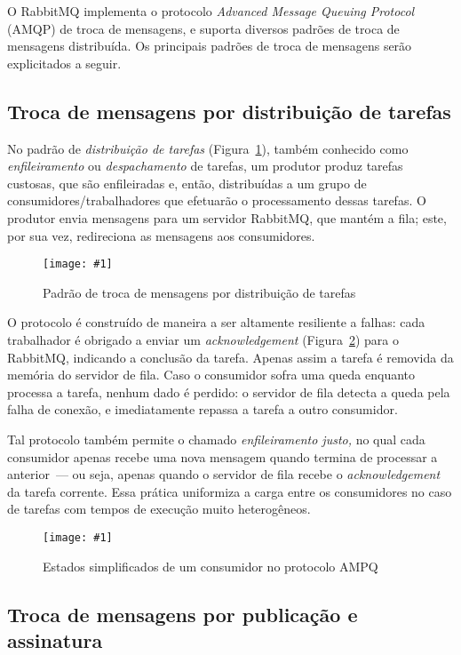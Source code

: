 \documentclass[ruledheader, 12pt]{abnt}
\newcommand{\figcustom}[4]{\par
	\begin{figure}[#3]
		\centering
		\texttt{[image: \#1]}
		\caption{\label{fig:#1}#2}
	\end{figure}
\par}
\newcommand{\fig}[2]{\figcustom{#1}{#2}{bp}{1}}
\newcommand{\figsmall}[2]{\figcustom{#1}{#2}{bp}{.6}}
\newcommand{\figref}[1]{(Figura~\ref{fig:#1})}
\begin{document}

O RabbitMQ implementa o protocolo \emph{Advanced Message Queuing Protocol} (AMQP) de troca de mensagens, e suporta diversos padrões de troca de mensagens distribuída. Os principais padrões de troca de mensagens serão explicitados a seguir.

\subsection{Troca de mensagens por distribuição de tarefas}

No padrão de \emph{distribuição de tarefas} \figref{rabbitmq-workqueue}, também conhecido como \emph{enfileiramento} ou \emph{despachamento} de tarefas, um produtor produz tarefas custosas, que são enfileiradas e, então, distribuídas a um grupo de consumidores/trabalhadores que efetuarão o processamento dessas tarefas. O produtor envia mensagens para um servidor RabbitMQ, que mantém a fila; este, por sua vez, redireciona as mensagens aos consumidores.

\fig{rabbitmq-workqueue}{Padrão de troca de mensagens por distribuição de tarefas}

O protocolo é construído de maneira a ser altamente resiliente a falhas: cada trabalhador é obrigado a enviar um \emph{acknowledgement} \figref{rabbitmq-worker} para o RabbitMQ, indicando a conclusão da tarefa. Apenas assim a tarefa é removida da memória do servidor de fila. Caso o consumidor sofra uma queda enquanto processa a tarefa, nenhum dado é perdido: o servidor de fila detecta a queda pela falha de conexão, e imediatamente repassa a tarefa a outro consumidor.

Tal protocolo também permite o chamado \emph{enfileiramento justo,} no qual cada consumidor apenas recebe uma nova mensagem quando termina de processar a anterior~--- ou seja, apenas quando o servidor de fila recebe o \emph{acknowledgement} da tarefa corrente. Essa prática uniformiza a carga entre os consumidores no caso de tarefas com tempos de execução muito heterogêneos.

\figsmall{rabbitmq-worker}{Estados simplificados de um consumidor no protocolo AMPQ}

\subsection{Troca de mensagens por publicação e assinatura}

\end{document}
